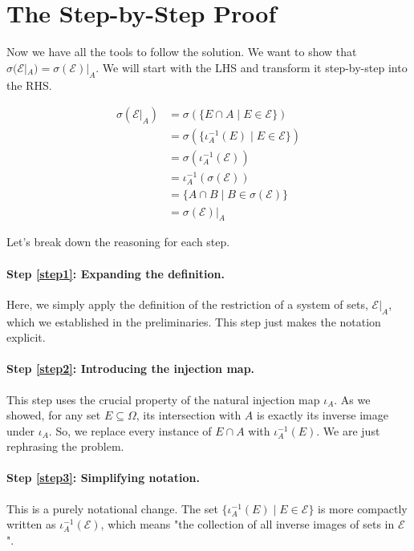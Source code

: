 \documentclass[11pt,a4paper]{article}
\begin{document}
\section{The Step-by-Step Proof}

Now we have all the tools to follow the solution. We want to show that $\sigma(\mathcal{E}|_A) = \sigma(\mathcal{E})|_A$. We will start with the LHS and transform it step-by-step into the RHS.

\begin{align}
    \sigma(\mathcal{E}|_A) &= \sigma\left( \{E \cap A \mid E \in \mathcal{E}\} \right) \label{step1} \\
    &= \sigma\left( \{\iota_A^{-1}(E) \mid E \in \mathcal{E}\} \right) \label{step2} \\
    &= \sigma\left( \iota_A^{-1}(\mathcal{E}) \right) \label{step3} \\
    &= \iota_A^{-1}\left( \sigma(\mathcal{E}) \right) \label{step4} \\
    &= \{A \cap B \mid B \in \sigma(\mathcal{E})\} \label{step5} \\
    &= \sigma(\mathcal{E})|_A \label{step6}
\end{align}

Let's break down the reasoning for each step.

\paragraph{Step \eqref{step1}: Expanding the definition.}
Here, we simply apply the definition of the restriction of a system of sets, $\mathcal{E}|_A$, which we established in the preliminaries. This step just makes the notation explicit.

\paragraph{Step \eqref{step2}: Introducing the injection map.}
This step uses the crucial property of the natural injection map $\iota_A$. As we showed, for any set $E \subseteq \Omega$, its intersection with $A$ is exactly its inverse image under $\iota_A$. So, we replace every instance of $E \cap A$ with $\iota_A^{-1}(E)$. We are just rephrasing the problem.

\paragraph{Step \eqref{step3}: Simplifying notation.}
This is a purely notational change. The set $\{\iota_A^{-1}(E) \mid E \in \mathcal{E}\}$ is more compactly written as $\iota_A^{-1}(\mathcal{E})$, which means "the collection of all inverse images of sets in $\mathcal{E}$".
\end{document}
